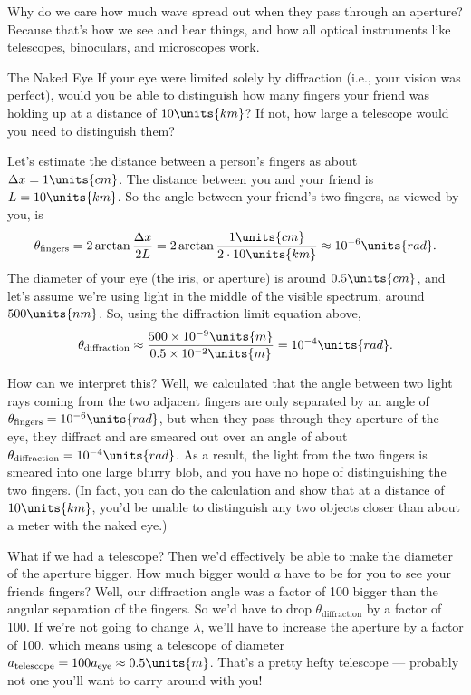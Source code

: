 Why do we care how much wave spread out when they pass through an aperture?  
Because that's how we see and hear things, and how all optical instruments like
telescopes, binoculars, and microscopes work.

\begin{example}{The Naked Eye}
\label{exampleNakedEye}
If your eye were limited solely by diffraction (i.e., your vision was perfect),
would you be able to distinguish how many fingers your friend
was holding up at a distance of $10\units{km}$? If not, how large a telescope
would you need to distinguish them?

\begin{solution}
Let's estimate the distance between a person's fingers as
about $\Delta x=1\units{cm}$.  The distance between you and your
friend is $L=10\units{km}$.  So the angle between your friend's two
fingers, as viewed by you, is
\begin{equation}
\theta_\text{fingers}=2\arctan\frac{\Delta
  x}{2L}=2\arctan\frac{1\units{cm}}{2\cdot 10\units{km}}\approx
10^{-6}\units{rad}.
\end{equation}
The diameter of your eye (the iris, or aperture) is around
$0.5\units{cm}$, and let's assume we're using light in the middle of
the visible spectrum, around $500\units{nm}$.  So, using the
diffraction limit equation above,
\begin{equation}
\theta_\text{diffraction}\approx \frac{500\times
  10^{-9}\units{m}}{0.5\times 10^{-2}\units{m}} =10^{-4}\units{rad}.
\end{equation}

How can we interpret this? Well, we calculated that the angle between
two light rays coming from the two adjacent fingers are only separated
by an angle of $\theta_\text{fingers}=10^{-6}\units{rad}$, but when
they pass through they aperture of the eye, they diffract and are
smeared out over an angle of about
$\theta_\text{diffraction}=10^{-4}\units{rad}$.  As a result, the
light from the two fingers is smeared into one large blurry blob, and
you have no hope of distinguishing the two fingers.  (In fact, you can
do the calculation and show that at a distance of $10\units{km}$,
you'd be unable to distinguish any two objects closer than about a
meter with the naked eye.)

What if we had a telescope? Then we'd effectively be able to make the
diameter of the aperture bigger.  How much bigger would $a$ have to be
for you to see your friends fingers?  Well, our diffraction angle was
a factor of 100 bigger than the angular separation of the fingers. So
we'd have to drop $\theta_\text{diffraction}$ by a factor of 100.  If
we're not going to change $\lambda$, we'll have to increase the
aperture by a factor of 100, which means using a telescope of diameter
$a_\text{telescope} = 100a_\text{eye} \approx 0.5\units{m}$.  That's a
pretty hefty telescope --- probably not one you'll want to carry around
with you!

\end{solution}
\end{example}


